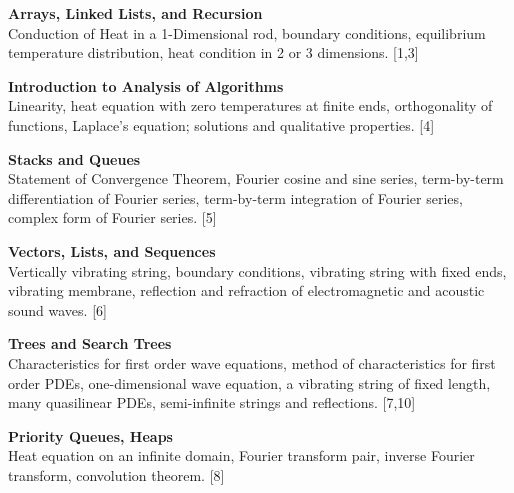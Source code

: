 \documentclass{article}
\begin{document}
\maketitle
{\small
  \noindent\textbf{Arrays, Linked Lists, and Recursion}\\
  Conduction of Heat in a 1-Dimensional rod, boundary conditions, equilibrium temperature distribution, heat condition in 2 or 3 dimensions.\hspace*{\fill} [1,3]

  \vspace{10pt}
  \noindent\textbf{Introduction to Analysis of Algorithms}\\
  Linearity, heat equation with zero temperatures at finite ends, orthogonality of functions, Laplace's equation; solutions and qualitative properties.\hspace*{\fill} [4]

  \vspace{10pt}
  \noindent\textbf{Stacks and Queues}\\
  Statement of Convergence Theorem, Fourier cosine and sine series, term-by-term differentiation of Fourier series, term-by-term integration of Fourier series, complex form of Fourier series.\hspace*{\fill} [5]

  \vspace{10pt}
  \noindent\textbf{Vectors, Lists, and Sequences}\\
  Vertically vibrating string, boundary conditions, vibrating string with fixed ends, vibrating membrane, reflection and refraction of electromagnetic and acoustic sound waves.\hspace*{\fill} [6]

  \vspace{10pt}
  \noindent\textbf{Trees and Search Trees}\\
  Characteristics for first order wave equations, method of characteristics for first order PDEs, one-dimensional wave equation, a vibrating string of fixed length, many quasilinear PDEs, semi-infinite strings and reflections. \hspace*{\fill} [7,10]

  \vspace{10pt}
  \noindent\textbf{Priority Queues, Heaps}\\
  Heat equation on an infinite domain, Fourier transform pair, inverse Fourier transform, convolution theorem.\hspace*{\fill} [8]

}
\end{document}
